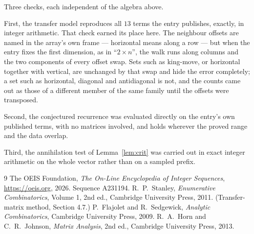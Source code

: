 \documentclass[11pt,a4paper]{article}
\theoremstyle{plain}
\theoremstyle{definition}
\begin{document}
Three checks, each independent of the algebra above.

First, the transfer model reproduces all $13$ terms the entry publishes, exactly, in
integer arithmetic. That check earned its place here. The neighbour offsets are named in the
array's own frame --- horizontal means along a row --- but when the entry fixes the first
dimension, as in ``$2\times n$'', the walk runs along columns and the two components of every
offset swap. Sets such as king-move, or horizontal together with vertical, are unchanged by
that swap and hide the error completely; a set such as horizontal, diagonal and antidiagonal
is not, and the counts came out as those of a different member of the same family until the
offsets were transposed.

Second, the conjectured recurrence was evaluated directly on the entry's own published terms,
with no matrices involved, and holds wherever the proved range and the data overlap.

Third, the annihilation test of Lemma~\ref{lem:crit} was carried out in exact integer
arithmetic on the whole vector rather than on a sampled prefix.

\begin{thebibliography}{9}
 The OEIS Foundation, \emph{The On-Line Encyclopedia of Integer
Sequences}, \url{https://oeis.org}, 2026. Sequence A231194.
 R.~P.~Stanley, \emph{Enumerative Combinatorics}, Volume 1, 2nd ed.,
Cambridge University Press, 2011. (Transfer-matrix method, Section 4.7.)
 P.~Flajolet and R.~Sedgewick, \emph{Analytic Combinatorics}, Cambridge
University Press, 2009.
 R.~A.~Horn and C.~R.~Johnson, \emph{Matrix Analysis}, 2nd ed., Cambridge
University Press, 2013.
\end{thebibliography}
\end{document}
